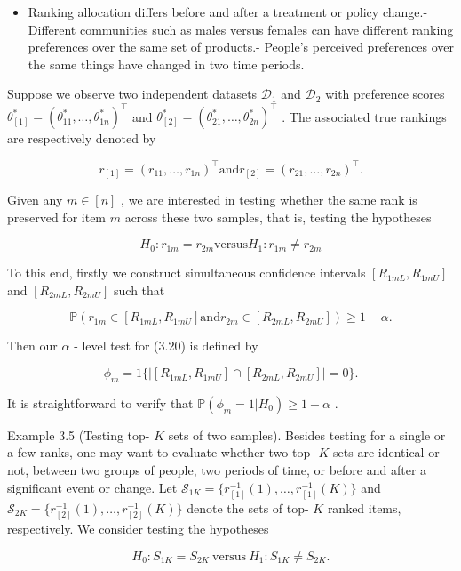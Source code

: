 \begin{itemize}
\tightlist
\item
  Ranking allocation differs before and after a treatment or policy
  change.- Different communities such as males versus females can have
  different ranking preferences over the same set of products.- People's
  perceived preferences over the same things have changed in two time
  periods.
\end{itemize}

Suppose we observe two independent datasets \(\mathcal{D}_1\) and
\(\mathcal{D}_2\) with preference scores
\(\theta_{[1]}^{*} = (\theta_{11}^{*},\ldots ,\theta_{1n}^{*})^{\top}\)
and
\(\theta_{[2]}^{*} = (\theta_{21}^{*},\ldots ,\theta_{2n}^{*})^{\top}\)
. The associated true rankings are respectively denoted by

\[
r_{[1]} = (r_{11},\ldots ,r_{1n})^{\top} \text{and} r_{[2]} = (r_{21},\ldots ,r_{2n})^{\top}.
\]

Given any \(m\in [n]\) , we are interested in testing whether the same
rank is preserved for item \(m\) across these two samples, that is,
testing the hypotheses

\[
H_{0}:r_{1m} = r_{2m} \text{versus} H_{1}:r_{1m}\neq r_{2m} \tag{3.20}
\]

To this end, firstly we construct simultaneous confidence intervals
\([R_{1mL},R_{1mU}]\) and \([R_{2mL},R_{2mU}]\) such that

\[
\mathbb{P}(r_{1m}\in [R_{1mL},R_{1mU}]\text{and} r_{2m}\in [R_{2mL},R_{2mU}])\geq 1 - \alpha . \tag{3.21}
\]

Then our \(\alpha\) - level test for (3.20) is defined by

\[
\phi_{m} = 1\{|[R_{1mL},R_{1mU}]\cap [R_{2mL},R_{2mU}]| = 0\} .
\]

It is straightforward to verify that
\(\mathbb{P}(\phi_{m} = 1|H_{0})\geq 1 - \alpha\) .

Example 3.5 (Testing top- \(K\) sets of two samples). Besides testing
for a single or a few ranks, one may want to evaluate whether two top-
\(K\) sets are identical or not, between two groups of people, two
periods of time, or before and after a significant event or change. Let
\(\mathcal{S}_{1K} = \{r_{[1]}^{- 1}(1),\ldots ,r_{[1]}^{- 1}(K)\}\) and
\(\mathcal{S}_{2K} = \{r_{[2]}^{- 1}(1),\ldots ,r_{[2]}^{- 1}(K)\}\)
denote the sets of top- \(K\) ranked items, respectively. We consider
testing the hypotheses

\[
H_{0}:S_{1K} = S_{2K}\mathrm{~versus~}H_{1}:S_{1K}\neq S_{2K}. \tag{3.22}
\]

